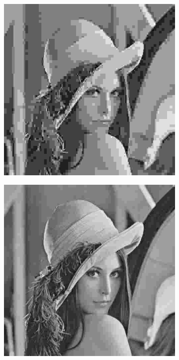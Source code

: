 \documentclass{article}
\begin{document}
\begin{figure}[htbp]
    \centering
    \begin{subfigure}{.19\textwidth}
        \includegraphics[width=\linewidth]{img/jpeg/0.jpg}
    \end{subfigure}
    \begin{subfigure}{.19\textwidth}
        \includegraphics[width=\linewidth]{img/jpeg/10.jpg}

\end{subfigure}
\end{figure}
\end{document}
